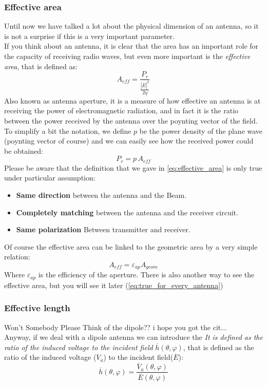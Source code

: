 \subsubsection*{Effective area}
Until now we have talked a lot about the physical dimension of an antenna, so it is not a surprise if this is a very important parameter.\\
If you think about an antenna, it is clear that the area has an important role for the capacity of receiving radio waves, but even more important is the \emph{effective area}, that is defined as:
\begin{equation}\label{eq:effective_area}
    A_{eff}=\frac{P_r}{\frac{|\overline{E}|^2}{2\eta}}
\end{equation}
Also known as antenna aperture, it is a measure of how effective an antenna is at receiving the power of electromagnetic radiation, and in fact it is the ratio between the power received by the antenna over the poynting vector of the field.\\
To simplify a bit the notation, we define $p$ be the power density of the plane wave (poynting vector of course) and we can easily see how the received power could be obtained:
\begin{equation}\label{eq:effective_area2}
    P_r=p\,A_{eff}
\end{equation}
Please be aware that the definition that we gave in \cref{eq:effective_area} is only true under particular assumption:
\begin{itemize}
    \item \textbf{Same direction} between the antenna and the Beam.
    \item \textbf{Completely matching} between the antenna and the receiver circuit.
    \item \textbf{Same polarization} Between transmitter and receiver.
\end{itemize}
Of course the effective area can be linked to the geometric area by a very simple relation:
\begin{equation}
    A_{eff}=\varepsilon_{ap} A_{geom}
\end{equation}
Where $\varepsilon_{ap}$ is the efficiency of the aperture.
There is also another way to see the effective area, but you will see it later (\cref{eq:true_for_every_antenna})
\subsubsection*{Effective length}
Won't Somebody Please Think of the dipole?? \footnotesize{i hope you got the cit...} \\
\normalsize
Anyway, if we deal with a dipole antenna we can introduce the \emph{It is defined as the ratio of the induced voltage to the incident field} $\overline{h}(\theta,\varphi)$, that is defined as the ratio of the induced voltage ($\overline{V}_a$) to the incident field($\overline{E}$):
\begin{equation}
    \overline{h}(\theta,\varphi)=\frac{\overline{V}_a(\theta,\varphi)}{\overline{E}(\theta,\varphi)}
\end{equation}
